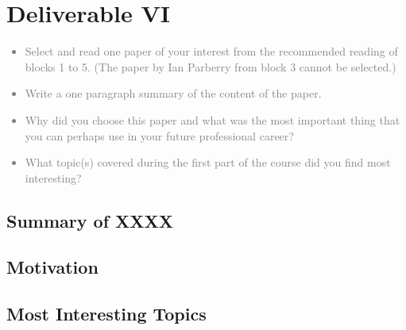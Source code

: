 \chapter{Deliverable VI}
\textcolor{gray}{%
\begin{itemize}
    \item Select and read one paper of your interest from the recommended reading of blocks 1 to 5. (The paper by Ian Parberry from block 3 cannot be selected.)
    \item Write a one paragraph summary of the content of the paper.
    \item Why did you choose this paper and what was the most important thing that you can perhaps use in your future professional career?
    \item What topic(s) covered during the first part of the course did you find most interesting?
\end{itemize}}

\section{Summary of XXXX}

\section{Motivation}

\section{Most Interesting Topics}
